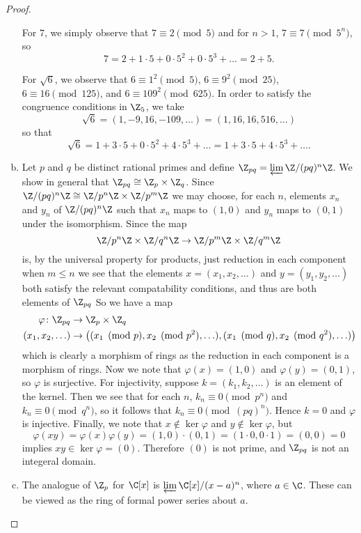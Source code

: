 \documentclass[10pt]{amsart}
\begin{document}
\begin{thm}
\begin{proof}
\begin{enumerate}[(a)]
		For $7$, we simply observe that $7 \equiv 2 \pmod{5}$ and for $n > 1$, $7 \equiv 7 \pmod{5^n}$, so
		$$7 = 2 + 1\cdot 5 + 0\cdot 5^2 + 0 \cdot 5^3 + \ldots = 2 + 5.$$
	
		For $\sqrt{6}$, we observe that $6 \equiv 1^2 \pmod{5}$, $6 \equiv 9^2 \pmod{25}$, $6 \equiv 16 \pmod{125}$, and $6 \equiv 109^2 \pmod{625}$.
		In order to satisfy the congruence conditions in $\Z_5$, we take
		$$\sqrt{6} = (1, -9, 16, -109, \ldots) = (1, 16, 16, 516, \ldots)$$
		so that
		$$\sqrt{6} = 1 + 3\cdot 5 + 0 \cdot 5^2 + 4 \cdot 5^3 + \ldots = 1 + 3\cdot 5 + 4\cdot5^3 + \ldots.$$
		\item
		Let $p$ and $q$ be distinct rational primes and define $\Z_{pq} = \varprojlim{\Z/(pq)^n\Z}$.
		We show in general that $\Z_{pq} \cong \Z_p \times \Z_q$.
		Since $\Z/(pq)^n\Z \cong \Z/p^n\Z \times \Z/p^m\Z$ we may choose, for each $n$, elements $x_n$ and $y_n$ of $\Z/(pq)^n\Z$ such that $x_n$ maps to $(1,0)$ and $y_n$ maps to $(0,1)$ under the isomorphism.
		Since the map 
		$$\Z/p^n\Z \times \Z/q^n\Z \rightarrow \Z/p^m\Z \times \Z/q^m\Z$$
		is, by the universal property for products, just reduction in each component when $m \leq n$
		we see that the elements $x = (x_1, x_2, \ldots)$ and $y = (y_1, y_2, \ldots)$ both satisfy the relevant compatability conditions, and thus are both elements of $\Z_{pq}$
		So we have a map
		\begin{align*}
			\varphi \colon \Z_{pq} &\rightarrow \Z_p \times \Z_q\\
			(x_1, x_2, \ldots) & \rightarrow \left((x_1 \pmod{p}, x_2 \pmod{p^2}, \ldots), (x_1 \pmod{q}, x_2 \pmod{q^2}, \ldots)\right)
		\end{align*}
		which is clearly a morphism of rings as the reduction in each component is a morphism of rings.
		Now we note that $\varphi(x) = (1,0)$ and $\varphi(y) = (0,1)$, so $\varphi$ is surjective.
		For injectivity, suppose $k = (k_1, k_2, \ldots)$ is an element of the kernel.
		Then we see that for each $n$, $k_n \equiv 0 \pmod{p^n}$ and $k_n \equiv 0 \pmod{q^n}$, so it follows that $k_n \equiv 0 \pmod{(pq)^n}$.
		Hence $k = 0$ and $\varphi$ is injective.
		Finally, we note that $x \not \in \ker\varphi$ and $y \not \in \ker\varphi$, but
		$$\varphi(xy) = \varphi(x)\varphi(y) = (1,0)\cdot(0,1) = (1\cdot 0, 0 \cdot 1) = (0,0) = 0$$
		implies $xy \in \ker\varphi = (0)$.
		Therefore $(0)$ is not prime, and $\Z_{pq}$ is not an integeral domain.
		\item
		The analogue of $\Z_p$ for $\C[x]$ is $\varprojlim{\C[x]/(x - a)^n}$, where $a \in \C$.
		These can be viewed as the ring of formal power series about $a$.
		\end{enumerate}
		\end{proof}
\end{thm}
\end{document}
